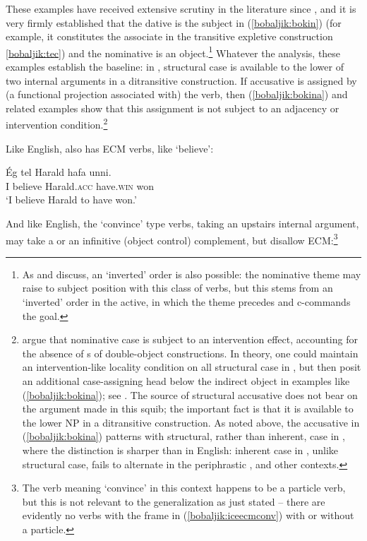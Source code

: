 \documentclass[output=paper]{langsci/langscibook}
\begin{document}
\noindent These examples have received extensive scrutiny in the literature since \cite{Zmt1985}, and it is very firmly established that the dative is the subject in (\ref{bobaljik:bokin}) (for example, it constitutes the associate in the transitive expletive construction \ref{bobaljik:tec}) and the nominative is an object.\footnote{As \citet{Holmberg1994} and \citet{Holmplat1995} discuss, an `inverted' order is also possible: the nominative theme may raise to subject position with this class of verbs, but this stems from an `inverted' order in the active, in which the theme precedes and c-commands the goal.} Whatever the analysis, these examples establish the baseline: in , structural case is available to the lower of two internal arguments in a ditransitive construction. If accusative is assigned by (a functional projection associated with) the verb, then (\ref{bobaljik:bokina}) and related examples show that this assignment is not subject to an adjacency or intervention condition.\footnote{\citet{Holmberg2002} argue that nominative case is subject to an intervention effect, accounting for the absence of s of double-object constructions. In theory, one could maintain an intervention-like locality condition on all structural case in , but then posit an additional case-assigning head below the indirect object in examples like (\ref{bobaljik:bokina}); see \cite{svenonius06}. The source of structural accusative does not bear on the argument made in this squib; the important fact is that it is available to the lower NP in a ditransitive construction. As noted above, the accusative in (\ref{bobaljik:bokina}) patterns with structural, rather than inherent, case in , where the distinction is sharper than in English: inherent case in , unlike structural case, fails to alternate in the periphrastic , and other contexts.} 

Like English,  also has ECM verbs, like `believe':

\begin{exe}
\ex \gll \'Eg tel Harald hafa unni\dh. \\
I believe Harald.{\scshape acc} have.{\scshape win} won \\
\glt `I believe Harald to have won.' 
\end{exe}

\noindent And like English, the `convince' type verbs, taking an upstairs internal argument, may take a  or an infinitive (object control) complement, but disallow ECM:\footnote{The verb meaning `convince' in this context happens to be a particle verb, but this is not relevant to the generalization as just stated -- there are evidently no verbs with the frame in (\ref{bobaljik:iceecmconv}) with or without a particle.}
\end{document}
